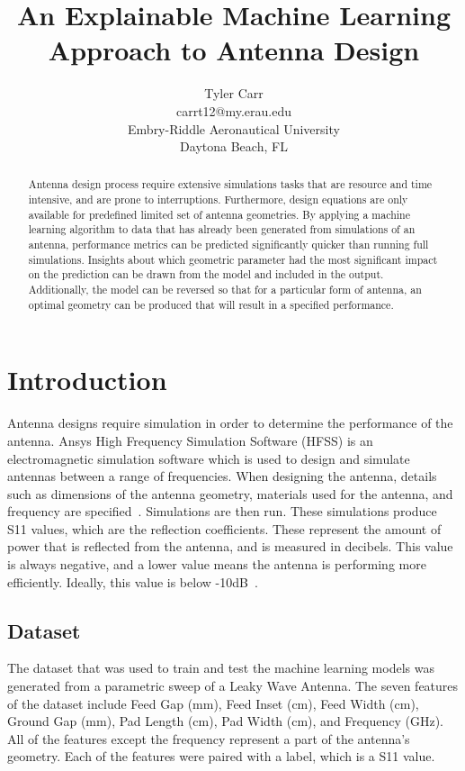 \documentclass[lettersize,journal]{IEEEtran}
\begin{document}
\title{An Explainable Machine Learning Approach to Antenna Design}

\author{Tyler Carr \\ carrt12@my.erau.edu \\ Embry-Riddle Aeronautical University \\ Daytona Beach, FL}

\maketitle

\begin{abstract}
Antenna design process require extensive simulations tasks that are resource and time intensive, and are prone to interruptions. Furthermore, design equations are only available for predefined limited set of antenna geometries. By applying a machine learning algorithm to data that has already been generated from simulations of an antenna, performance metrics can be predicted significantly quicker than running full simulations. Insights about which geometric parameter had the most significant impact on the prediction can be drawn from the model and included in the output. Additionally, the model can be reversed so that for a particular form of antenna, an optimal geometry can be produced that will result in a specified performance. 
\end{abstract}

\section{Introduction}
Antenna designs require simulation in order to determine the performance of the antenna. Ansys High Frequency Simulation Software (HFSS) is an electromagnetic simulation software which is used to design and simulate antennas between a range of frequencies. When designing the antenna, details such as dimensions of the antenna geometry, materials used for the antenna, and frequency are specified~\cite{Maxworth_2022}. Simulations are then run. These simulations produce S11 values, which are the reflection coefficients. These represent the amount of power that is reflected from the antenna, and is measured in decibels. This value is always negative, and a lower value means the antenna is performing more efficiently. Ideally, this value is below -10dB~\cite{Bevelacqua_2015}.


\subsection{Dataset}
The dataset that was used to train and test the machine learning models was generated from a parametric sweep of a Leaky Wave Antenna. The seven features of the dataset include Feed Gap (mm), Feed Inset (cm), Feed Width (cm), Ground Gap (mm), Pad Length (cm), Pad Width (cm), and Frequency (GHz). All of the features except the frequency represent a part of the antenna's geometry. Each of the features were paired with a label, which is a S11 value. 
\end{document}
